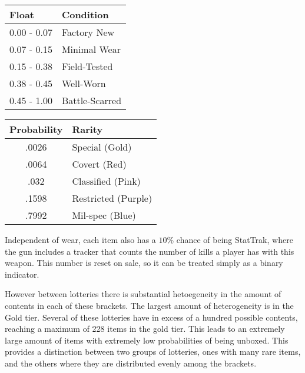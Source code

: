 \documentclass[12pt]{paper}
\begin{document}
\begin{table*}[!htb]
    \begin{minipage}{.5\linewidth}
      \caption{Condition Probabilities}
      \centering
        \begin{tabular}{|l|l|}\hline
          Float & Condition\\\hline
          0.00 - 0.07 & Factory New\\
          0.07 - 0.15 & Minimal Wear\\
          0.15 - 0.38 & Field-Tested\\
          0.38 - 0.45 & Well-Worn\\
          0.45 - 1.00 & Battle-Scarred\\\hline
\end{tabular}
    \end{minipage}%
    \begin{minipage}{.5\linewidth}
      \centering
        \caption{Rarity Probabilities}
        \begin{tabular}{|c|l|}\hline
          Probability & Rarity\\\hline
          .0026 & Special (Gold)\\
          .0064 & Covert (Red)\\
          .032 & Classified (Pink)\\
          .1598 & Restricted (Purple)\\
          .7992 & Mil-spec (Blue)\\\hline
\end{tabular}
    \end{minipage} 
\end{table*}

Independent of wear, each item
also has a $10\%$ chance of being StatTrak\texttrademark, where the
gun includes a tracker that counts the number of kills a player has
with this weapon. This number is reset on sale, so it can be treated
simply as a binary indicator.

However between lotteries there is substantial hetoegeneity in the
amount of contents in each of these brackets. The largest amount of
heterogeneity is in the Gold tier.  Several of these lotteries have in
excess of a hundred possible contents, reaching a maximum of 228 items
in the gold tier. This leads to an extremely large amount of items
with extremely low probabilities of being unboxed. This provides a
distinction between two groups of lotteries, ones with many rare
items, and the others where they are distributed evenly among the
brackets.
\end{document}
